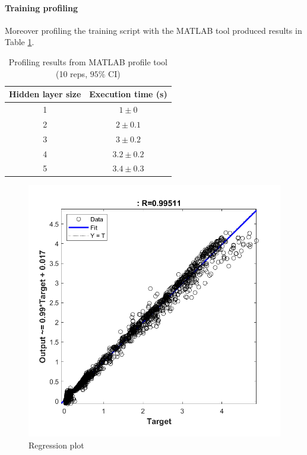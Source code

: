 \documentclass[twocolumn,a4paper]{article}
\begin{document}
\paragraph{Training profiling} Moreover profiling the training script with the MATLAB tool produced results in Table \ref{tab:prof_res}.
\begin{table}[]
\centering
\begin{tabular}{|c|c|}
\hline
\textbf{Hidden layer size} & \textbf{Execution time (s)} \\ \hline
1                          & $1 \pm 0$                           \\ \hline
2                          & $2 \pm 0.1$                           \\ \hline
3                          & $3 \pm 0.2$                           \\ \hline
4                          & $3.2 \pm 0.2$                          \\ \hline
5                          & $3.4 \pm 0.3$                         \\ \hline
\end{tabular}
\caption{Profiling results from MATLAB profile tool (10 reps, $95\%$ CI)}
\label{tab:prof_res}
\end{table}
\begin{figure}
	\centering
	\includegraphics[width=\linewidth]{images/net_4_reg.png}
	\caption{Regression plot}
	\label{fig:r_plot}
\end{figure}
\end{document}
